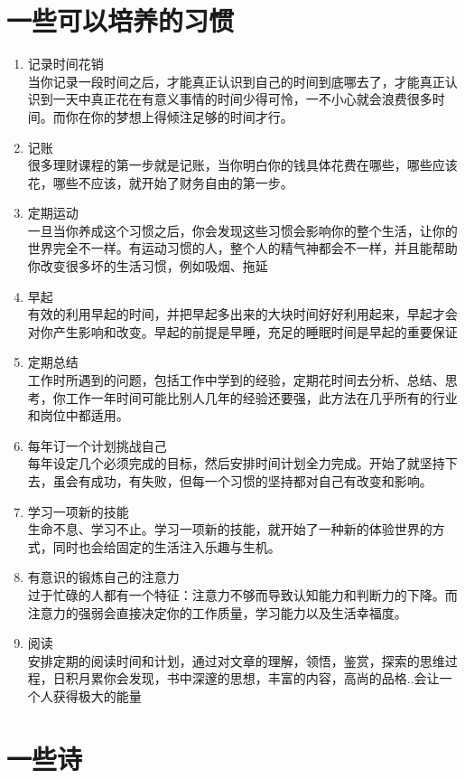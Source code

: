 \documentclass[UTF8,a4paper,8pt]{ctexart}
\begin{document}
 \newpage
 \section{一些可以培养的习惯}
 \begin{enumerate}
 	\item 记录时间花销\\
 	当你记录一段时间之后，才能真正认识到自己的时间到底哪去了，才能真正认识到一天中真正花在有意义事情的时间少得可怜，一不小心就会浪费很多时间。而你在你的梦想上得倾注足够的时间才行。		
 	\item 记账\\
 	很多理财课程的第一步就是记账，当你明白你的钱具体花费在哪些，哪些应该花，哪些不应该，就开始了财务自由的第一步。
 	\item 定期运动\\
 	一旦当你养成这个习惯之后，你会发现这些习惯会影响你的整个生活，让你的世界完全不一样。有运动习惯的人，整个人的精气神都会不一样，并且能帮助你改变很多坏的生活习惯，例如吸烟、拖延
 	\item 早起\\
 	有效的利用早起的时间，并把早起多出来的大块时间好好利用起来，早起才会对你产生影响和改变。早起的前提是早睡，充足的睡眠时间是早起的重要保证
 	\item 定期总结\\
 	工作时所遇到的问题，包括工作中学到的经验，定期花时间去分析、总结、思考，你工作一年时间可能比别人几年的经验还要强，此方法在几乎所有的行业和岗位中都适用。
 	\item 每年订一个计划挑战自己\\
 	每年设定几个必须完成的目标，然后安排时间计划全力完成。开始了就坚持下去，虽会有成功，有失败，但每一个习惯的坚持都对自己有改变和影响。
 	\item 学习一项新的技能\\
 	生命不息、学习不止。学习一项新的技能，就开始了一种新的体验世界的方式，同时也会给固定的生活注入乐趣与生机。
 	\item 有意识的锻炼自己的注意力\\
 	过于忙碌的人都有一个特征：注意力不够而导致认知能力和判断力的下降。而注意力的强弱会直接决定你的工作质量，学习能力以及生活幸福度。
 	\item 阅读\\
 	安排定期的阅读时间和计划，通过对文章的理解，领悟，鉴赏，探索的思维过程，日积月累你会发现，书中深邃的思想，丰富的内容，高尚的品格..会让一个人获得极大的能量
 \end{enumerate}
 
 \newpage 
 \section{一些诗}
\end{document}
